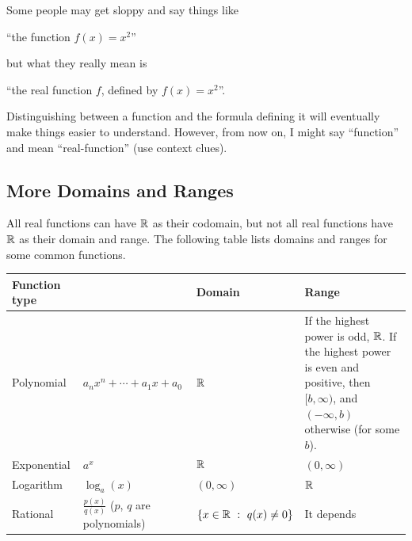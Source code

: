 Some people may get sloppy and say things like
\begin{center}
``the function $f(x)=x^2$''
\end{center}
but what they really mean is
\begin{center}
``the real function $f$, defined by $f(x)=x^2$''.
\end{center}
Distinguishing between a function and the formula defining it will eventually make things easier to understand. However, from now on, I might say ``function'' and mean ``real-function'' (use context clues). 


\subsection{More Domains and Ranges}

All real functions can have $\mathbb{R}$ as their codomain, but not all real functions have $\mathbb{R}$ as their domain and range. The following table lists domains and ranges for some common functions.

\begin{center}
\renewcommand{\arraystretch}{1.3}
\begin{tabular}{@{}p{1in}p{1.6in}lp{2.25in}@{}}
\toprule[0.4mm]
Function type & & Domain & Range \\
\hline
Polynomial & $a_nx^n+\cdots+a_1x+a_0$ & $\mathbb{R}$ & If the highest power is odd, $\mathbb{R}$. If the highest power is even and positive, then $[b,\infty)$, and $(-\infty,b)$ otherwise (for some $b$).\\
Exponential & $a^x$ & $\mathbb{R}$ & $(0,\infty)$\\
Logarithm & $\log_a(x)$ & $(0,\infty)$ & $\mathbb{R}$\\
Rational & $\frac{p(x)}{q(x)}$ \hspace{3in} ($p$, $q$ are polynomials) & $\{x\in\R\ :\ q(x)\neq 0\}$ & It depends\\
\bottomrule[0.4mm]
\end{tabular}
\end{center}



